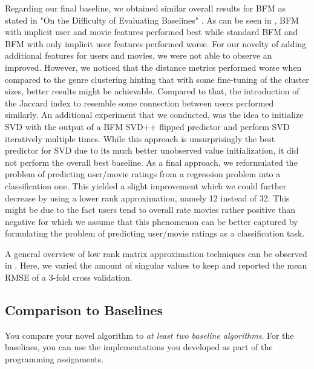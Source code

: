 \documentclass[10pt,conference,compsocconf]{IEEEtran}
\begin{document}
    Regarding our final baseline, we obtained similar overall results for BFM as stated in "On the Difficulty of Evaluating Baselines" \cite{rendle_difficulty_2019}.
    As can be seen in , BFM with implicit user and movie features performed best while standard BFM and BFM with only implicit user features performed worse.
    For our novelty of adding additional features for users and movies, we were not able to observe an improved.
    However, we noticed that the distance metrics performed worse when compared to the genre clustering hinting that with some fine-tuning of the cluster sizes, better results might be achievable.
    Compared to that, the introduction of the Jaccard index to resemble some connection between users performed similarly.
    An additional experiment that we conducted, was the idea to initialize SVD with the output of a BFM SVD++ flipped predictor and perform SVD iteratively multiple times.
    While this approach is unsurprisingly the best predictor for SVD due to its much better unobserved value initialization, it did not perform the overall best baseline.
    As a final approach, we reformulated the problem of predicting user/movie ratings from a regression problem into a classification one.
    This yielded a slight improvement which we could further decrease by using a lower rank approximation, namely 12 instead of 32.
    This might be due to the fact users tend to overall rate movies rather positive than negative for which we assume that this phenomenon can be better captured by formulating the problem of predicting user/movie ratings as a classification task.

    A general overview of low rank matrix approximation techniques can be observed in .
    Here, we varied the amount of singular values to keep and reported the mean RMSE of a 3-fold cross validation.

    \subsection{Comparison to Baselines}

    You compare your novel algorithm to \emph{at least two baseline
    algorithms}. For the baselines, you can use the implementations you
    developed as part of the programming assignments.
\end{document}
